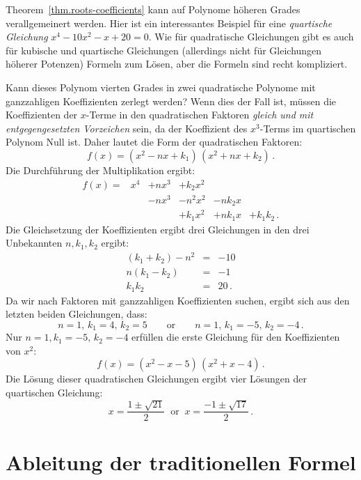 \begin{example}
Theorem~\ref{thm.roots-coefficients} kann auf Polynome höheren Grades verallgemeinert werden. Hier ist ein interessantes Beispiel für eine \emph{quartische Gleichung} $x^4-10x^2-x+20=0$. Wie für quadratische Gleichungen gibt es auch für kubische und quartische Gleichungen (allerdings nicht für Gleichungen höherer Potenzen) Formeln zum Lösen, aber die Formeln sind recht kompliziert.

Kann dieses Polynom vierten Grades in zwei quadratische Polynome mit ganzzahligen Koeffizienten zerlegt werden? Wenn dies der Fall ist, müssen die Koeffizienten der $x$-Terme in den quadratischen Faktoren \emph{gleich und mit entgegengesetzten Vorzeichen} sein, da der Koeffizient des $x^3$-Terms im quartischen Polynom Null ist. Daher lautet die Form der quadratischen Faktoren:
\[
f(x) = (x^2 - nx + k_1)\, (x^2 + nx + k_2)\,.
\]
Die Durchführung der Multiplikation ergibt:
\[
\renewcommand{\arraystretch}{1.1}
\begin{array}{rrrrrr}
f(x) = &x^4 & + nx^3 & + k_2 x^2\\
&& -nx^3 &- n^2x^2 &-nk_2x\\
&&&+k_1x^2 &+ nk_1x &+ k_1k_2\,.
\end{array}
\]
Die Gleichsetzung der Koeffizienten ergibt drei Gleichungen in den drei Unbekannten $n,k_1,k_2$ ergibt:
\begin{eqnarray*}
(k_1+k_2)-n^2 &=& -10\\
n(k_1-k_2) &=& -1\\
k_1k_2 &=& 20\,.
\end{eqnarray*}
Da wir nach Faktoren mit ganzzahligen Koeffizienten suchen, ergibt sich aus den letzten beiden Gleichungen, dass:
\[
n=1,\,k_1=4,\,k_2=5  \quad\quad\textrm{or} \quad\quad n=1,\,k_1=-5,\, k_2=-4\,.
\]
Nur $n=1,k_1=-5,\, k_2=-4$ erfüllen die erste Gleichung für den Koeffizienten von $x^2$:
\[
f(x) = (x^2 - x - 5)\, (x^2 + x - 4)\,.
\]
Die Lösung dieser quadratischen Gleichungen ergibt vier Lösungen der quartischen Gleichung:
\[
x = \frac{1\pm\sqrt{21}}{2}  \;\;\textrm{or} \;\; x= \frac{-1\pm\sqrt{17}}{2} \,.
\]
\end{example}

\section{Ableitung der traditionellen Formel}\label{s.general}

